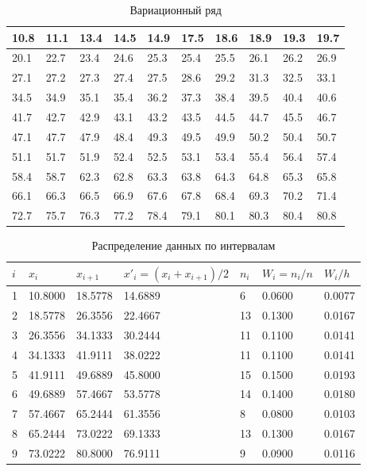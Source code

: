 \documentclass{article}
\theoremstyle{problemstyle}
\begin{document}
\begin{table}[H]
  \centering
  \begin{tabular}{|l|l|l|l|l|l|l|l|l|l|}
    \hline
    10.8 & 11.1 & 13.4 & 14.5 & 14.9 & 17.5 & 18.6 & 18.9 & 19.3 & 19.7 \\
    \hline
    20.1 & 22.7 & 23.4 & 24.6 & 25.3 & 25.4 & 25.5 & 26.1 & 26.2 & 26.9 \\
    \hline
    27.1 & 27.2 & 27.3 & 27.4 & 27.5 & 28.6 & 29.2 & 31.3 & 32.5 & 33.1 \\
    \hline
    34.5 & 34.9 & 35.1 & 35.4 & 36.2 & 37.3 & 38.4 & 39.5 & 40.4 & 40.6 \\
    \hline
    41.7 & 42.7 & 42.9 & 43.1 & 43.2 & 43.5 & 44.5 & 44.7 & 45.5 & 46.7 \\
    \hline
    47.1 & 47.7 & 47.9 & 48.4 & 49.3 & 49.5 & 49.9 & 50.2 & 50.4 & 50.7 \\
    \hline
    51.1 & 51.7 & 51.9 & 52.4 & 52.5 & 53.1 & 53.4 & 55.4 & 56.4 & 57.4 \\
    \hline
    58.4 & 58.7 & 62.3 & 62.8 & 63.3 & 63.8 & 64.3 & 64.8 & 65.3 & 65.8 \\
    \hline
    66.1 & 66.3 & 66.5 & 66.9 & 67.6 & 67.8 & 68.4 & 69.3 & 70.2 & 71.4 \\
    \hline
    72.7 & 75.7 & 76.3 & 77.2 & 78.4 & 79.1 & 80.1 & 80.3 & 80.4 & 80.8 \\
    \hline
  \end{tabular}
  \caption{Вариационный ряд}\label{table:var_series}
\end{table}

\begin{table}[H]
  \centering
  \begin{tabular}{|l|l|l|l|l|l|l|}
    \hline
    \(i\) & \(x_i\) & \(x_{i+1}\) & \(x'_i = (x_i + x_{i+1})/2\) & \(n_i\) & \(W_i = n_i/n\) & \(W_i/h\) \\
    \hline
1 & 10.8000 & 18.5778 & 14.6889 & 6 & 0.0600 & 0.0077  \\
    \hline
2 & 18.5778 & 26.3556 & 22.4667 & 13 & 0.1300 & 0.0167 \\
    \hline
3 & 26.3556 & 34.1333 & 30.2444 & 11 & 0.1100 & 0.0141 \\
    \hline
4 & 34.1333 & 41.9111 & 38.0222 & 11 & 0.1100 & 0.0141 \\
    \hline
5 & 41.9111 & 49.6889 & 45.8000 & 15 & 0.1500 & 0.0193 \\
    \hline
6 & 49.6889 & 57.4667 & 53.5778 & 14 & 0.1400 & 0.0180 \\
    \hline
7 & 57.4667 & 65.2444 & 61.3556 & 8 & 0.0800 & 0.0103 \\
    \hline
8 & 65.2444 & 73.0222 & 69.1333 & 13 & 0.1300 & 0.0167 \\
    \hline
9 & 73.0222 & 80.8000 & 76.9111 & 9 & 0.0900 & 0.0116 \\
    \hline
  \end{tabular}
  \caption{Распределение данных по интервалам}\label{table:intervals}
\end{table}
\end{document}
